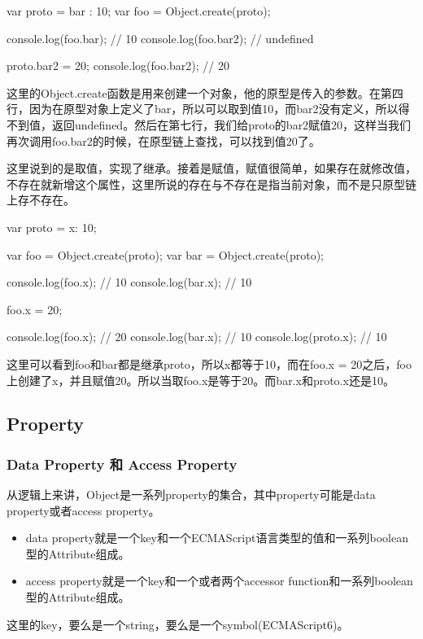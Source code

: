 	
\begin{JavaScript}
var proto = {bar : 10};
var foo = Object.create(proto);

console.log(foo.bar); // 10
console.log(foo.bar2); // undefined

proto.bar2 = 20; 
console.log(foo.bar2); // 20
\end{JavaScript}
	
这里的Object.create函数是用来创建一个对象，他的原型是传入的参数。在第四行，因为在原型对象上定义了bar，所以可以取到值10，而bar2没有定义，所以得不到值，返回undefined。然后在第七行，我们给proto的bar2赋值20，这样当我们再次调用foo.bar2的时候，在原型链上查找，可以找到值20了。
	
	
这里说到的是取值，实现了继承。接着是赋值，赋值很简单，如果存在就修改值，不存在就新增这个属性，这里所说的存在与不存在是指当前对象，而不是只原型链上存不存在。
	
\begin{JavaScript}
var proto = {x: 10};

var foo = Object.create(proto);
var bar = Object.create(proto);

console.log(foo.x); // 10
console.log(bar.x); // 10

foo.x = 20;

console.log(foo.x); // 20
console.log(bar.x); // 10
console.log(proto.x); // 10
\end{JavaScript}
		
这里可以看到foo和bar都是继承proto，所以x都等于10，而在foo.x = 20之后，foo上创建了x，并且赋值20。所以当取foo.x是等于20。而bar.x和proto.x还是10。

\subsection{Property}

\subsubsection{Data Property 和 Access Property}

从逻辑上来讲，Object是一系列property的集合，其中property可能是data property或者access property。
\begin{itemize}
\item data property就是一个key和一个ECMAScript语言类型的值和一系列boolean型的Attribute组成。
\item access property就是一个key和一个或者两个accessor function和一系列boolean型的Attribute组成。
\end{itemize}	
这里的key，要么是一个string，要么是一个symbol(ECMAScript6)。

